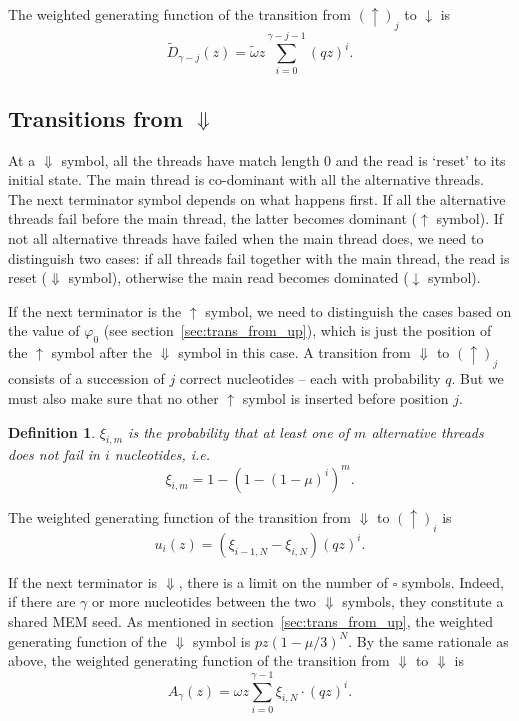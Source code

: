 \documentclass{article}
\newtheorem{definition}{Definition}
\begin{document}
The weighted generating function of the transition from
$(\uparrow)_j$ to $\downarrow$ is
\begin{equation}
\tilde{D}_{\gamma-j}(z) = \tilde{\omega} z
  \sum_{i=0}^{\gamma-j-1} (qz)^i.
\end{equation}


\subsection{Transitions from $\Downarrow$}
\label{sec:trans_from_Down}

At a $\Downarrow$ symbol, all the threads have match length $0$ and the
read is `reset' to its initial state. The main thread is co-dominant with
all the alternative threads. The next terminator symbol depends on what
happens first. If all the alternative threads fail before the main thread,
the latter becomes dominant ($\uparrow$ symbol). If not all alternative
threads have failed when the main thread does, we need to distinguish two
cases: if all threads fail together with the main thread, the read is
reset ($\Downarrow$ symbol), otherwise the main read becomes dominated
($\downarrow$ symbol).

If the next terminator is the $\uparrow$ symbol, we need to distinguish
the cases based on the value of $\varphi_0$ (see
section~\ref{sec:trans_from_up}), which is just the position of the
$\uparrow$ symbol after the $\Downarrow$ symbol in this case. A transition
from $\Downarrow$ to $(\uparrow)_j$ consists of a succession of $j$
correct nucleotides -- each with probability $q$. But we must also make
sure that no other $\uparrow$ symbol is inserted before position $j$.

\begin{definition}
$\xi_{i,m}$ is the probability that at least one of $m$ alternative
threads does not fail in $i$ nucleotides, \textit{i.e.}
\begin{equation}
  \xi_{i,m} = 1-(1-(1-\mu)^i)^m.
\end{equation}
\end{definition}

The weighted generating function of the transition from $\Downarrow$ to
$(\uparrow)_i$ is
\begin{equation}
u_i(z) = (\xi_{i-1,N}-\xi_{i,N})(qz)^i.
\end{equation}


If the next terminator is $\Downarrow$, there is a limit on the
number of $\square$ symbols. Indeed, if there are $\gamma$ or more
nucleotides between the two $\Downarrow$ symbols, they constitute a shared
MEM seed. As mentioned in section~\ref{sec:trans_from_up}, the weighted
generating function of the $\Downarrow$ symbol is $pz(1-\mu/3)^N$. By the
same rationale as above, the weighted generating function of the
transition from $\Downarrow$ to $\Downarrow$ is
\begin{equation}
A_{\gamma}(z) = \omega z
  \sum_{i=0}^{\gamma-1} \xi_{i,N} \cdot (qz)^i.
\end{equation}
\end{document}
